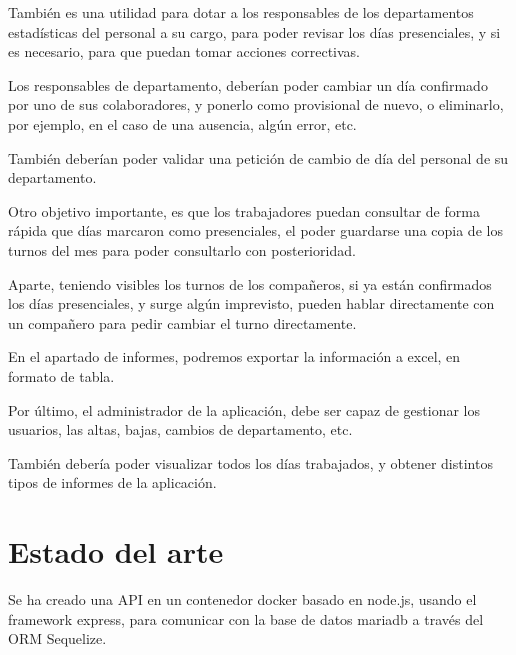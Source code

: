 \documentclass[11pt,spanish,listoffigures,listoftables]{tfgetsinf}
\begin{document}
También es una utilidad para dotar a los responsables de los departamentos estadísticas del personal a su cargo, para poder revisar los días presenciales, y si es necesario, para que puedan tomar acciones correctivas.

Los responsables de departamento, deberían poder cambiar un día confirmado por uno de sus colaboradores, y ponerlo como provisional de nuevo, o eliminarlo, por ejemplo, en el caso de una ausencia, algún error, etc.

También deberían poder validar una petición de cambio de día del personal de su departamento.

Otro objetivo importante, es que los trabajadores puedan consultar de forma rápida que días marcaron como presenciales, el poder guardarse una copia de los turnos del mes para poder consultarlo con posterioridad.

Aparte, teniendo visibles los turnos de los compañeros, si ya están confirmados los días presenciales, y surge algún imprevisto, pueden hablar directamente con un compañero para pedir cambiar el turno directamente.

En el apartado de informes, podremos exportar la información a excel, en formato de tabla.

Por último, el administrador de la aplicación, debe ser capaz de gestionar los usuarios, las altas, bajas, cambios de departamento, etc.

También debería poder visualizar todos los días trabajados, y obtener distintos tipos de informes de la aplicación.





\chapter{Estado del arte}

Se ha creado una API en un contenedor docker basado en node.js, usando el framework express, para comunicar con la base de datos mariadb a través del ORM Sequelize.  
\end{document}
